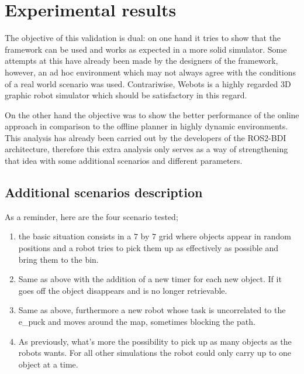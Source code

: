 \chapter{Experimental results}
The objective of this validation is dual: on one hand it tries to show that the framework can be used and works as expected in a more solid simulator. Some attempts at this have already been made by the designers of the framework, however, an ad hoc environment which may not always agree with the conditions of a real world scenario was used. Contrariwise, Webots is a highly regarded 3D graphic robot simulator which should be satisfactory in this regard.
\par
On the other hand the objective was to show the better performance of the online approach in comparison to the offline planner in highly dynamic environments. This analysis has already been carried out by the developers of the ROS2-BDI architecture, therefore this extra analysis only serves as a way of strengthening that idea with some additional scenarios and different parameters.

\section{Additional scenarios description}
As a reminder, here are the four scenario tested;
\begin{enumerate}
    \item the basic situation consists in a $7$ by $7$ grid where objects appear in random positions and a robot tries to pick them up as effectively as possible and bring them to the bin.
    \item Same as above with the addition of a new timer for each new object. If it goes off the object disappears and is no longer retrievable.
    \item Same as above, furthermore a new robot whose task is uncorrelated to the e\_puck and moves around the map, sometimes blocking the path.
    \item As previously, what's more the possibility to pick up as many objects as the robots wants. For all other simulations the robot could only carry up to one object at a time.
\end{enumerate}

